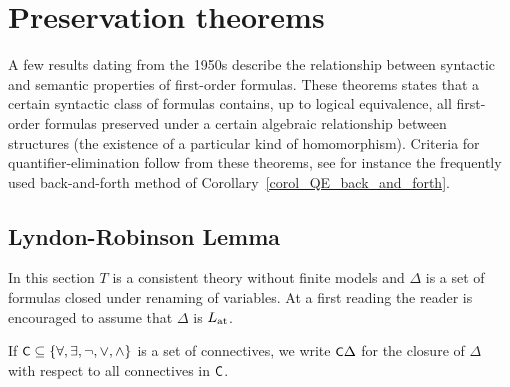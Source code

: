 \chapter{Preservation theorems}
\label{eliminazione}
\def\ceq#1#2#3{\noindent\smash{\parbox[t]{15ex}{$\displaystyle #1$}}\parbox{6ex}{\hfil $#2$}{$\displaystyle #3$}}


A few results dating from the 1950s describe the relationship between syntactic and semantic properties of first-order formulas. These theorems states that a certain syntactic class of formulas contains, up to logical equivalence, all first-order formulas preserved under a certain algebraic relationship between structures (the existence of a particular kind of homomorphism). Criteria for quantifier-elimination follow from these theorems, see for instance the frequently used back-and-forth method of Corollary~\ref{corol_QE_back_and_forth}.

\section{Lyndon-Robinson Lemma}
\label{TeoremidiPreservazione}

In this section $T$ is a consistent theory without finite models and $\Delta$ is a set of formulas closed under renaming of variables. At a first reading the reader is encouraged to assume that $\Delta$ is $L_{\rm at}$. 

If $\textsf{\small C}\subseteq\{\forall,\exists,\neg,\vee,\wedge\}$ is a set of connectives, we write \emph{$\textsf{\small C}\Delta$} for the closure of $\Delta$ with respect to all connectives in $\textsf{\small C}$.%





% 
% 



